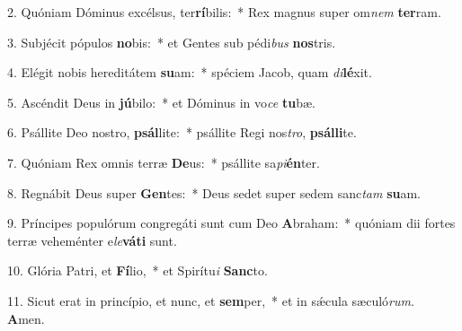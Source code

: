 2. Quóniam Dóminus excélsus, ter\textbf{rí}bilis:~*  Rex magnus super om\textit{nem} \textbf{ter}ram.\

3. Subjécit pópulos \textbf{no}bis:~*  et Gentes sub pédi\textit{bus} \textbf{nos}tris.\

4. Elégit nobis hereditátem \textbf{su}am:~*  spéciem Jacob, quam \textit{di}\textbf{lé}xit.\

5. Ascéndit Deus in \textbf{jú}bilo:~*  et Dóminus in vo\textit{ce} \textbf{tu}bæ.\

6. Psállite Deo nostro, \textbf{psál}lite:~*  psállite Regi nos\textit{tro}, \textbf{psál}\textbf{li}te.\

7. Quóniam Rex omnis terræ \textbf{De}us:~*  psállite sa\textit{pi}\textbf{én}ter.\

8. Regnábit Deus super \textbf{Gen}tes:~*  Deus sedet super sedem sanc\textit{tam} \textbf{su}am.\

9. Príncipes populórum congregáti sunt cum Deo \textbf{A}braham:~*  quóniam dii fortes terræ veheménter e\textit{le}\textbf{vá}\textbf{ti} sunt.\

10. Glória Patri, et \textbf{Fí}lio,~*  et Spirítu\textit{i} \textbf{Sanc}to.\

11. Sicut erat in princípio, et nunc, et \textbf{sem}per,~*  et in sǽcula sæculó\textit{rum}. \textbf{A}men.\

